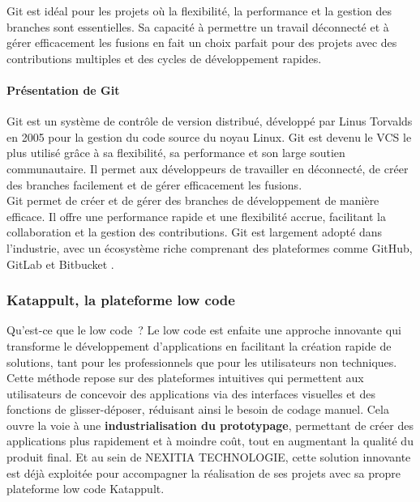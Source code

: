 \documentclass[12pt]{report}
\begin{document}
				Git est idéal pour les projets où la flexibilité, la performance et la gestion des branches sont essentielles. Sa capacité à permettre un travail déconnecté et à gérer efficacement les fusions en fait un choix parfait pour des projets avec des contributions multiples et des cycles de développement rapides.

				\paragraph{Présentation de Git}

				Git est un système de contrôle de version distribué, développé par Linus Torvalds en 2005 pour la gestion du code source du noyau Linux. Git est devenu le VCS le plus utilisé grâce à sa flexibilité, sa performance et son large soutien communautaire. Il permet aux développeurs de travailler en déconnecté, de créer des branches facilement et de gérer efficacement les fusions.\\

				Git permet de créer et de gérer des branches de développement de manière efficace. Il offre une performance rapide et une flexibilité accrue, facilitant la collaboration et la gestion des contributions. Git est largement adopté dans l'industrie, avec un écosystème riche comprenant des plateformes comme GitHub, GitLab et Bitbucket \cite{Tsitoara}.

				


				\subsubsection{Katappult, la plateforme low code}

				\hspace{15pt} Qu'est-ce que le low code ? Le low code est enfaite une approche innovante qui transforme le développement d'applications en facilitant la création rapide de solutions, tant pour les professionnels que pour les utilisateurs non techniques. Cette méthode repose sur des plateformes intuitives qui permettent aux utilisateurs de concevoir des applications via des interfaces visuelles et des fonctions de glisser-déposer, réduisant ainsi le besoin de codage manuel. Cela ouvre la voie à une \textbf{industrialisation du prototypage}, permettant de créer des applications plus rapidement et à moindre coût, tout en augmentant la qualité du produit final. Et au sein de NEXITIA TECHNOLOGIE, cette solution innovante est déjà exploitée pour accompagner la réalisation de ses projets avec sa propre plateforme low code Katappult.\\
	
\end{document}
